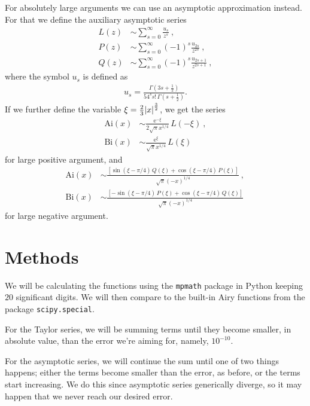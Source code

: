 \documentclass[10pt,a4paper,twocolumn]{article}
\newcommand{\Ai}{\mathrm{Ai}}
\newcommand{\Bi}{\mathrm{Bi}}
\begin{document}
For absolutely large arguments we can use an asymptotic approximation \cite{formulas} instead. For that we define the auxiliary asymptotic series
%
\begin{align}
  L(z) &\sim \sum_{s=0}^\infty \frac{u_s}{z^s}\>, \\
  P(z) &\sim \sum_{s=0}^\infty (-1)^s \frac{u_{2s}}{z^{2 s}}\>, \\
  Q(z) &\sim \sum_{s=0}^\infty (-1)^s \frac{u_{2s+1}}{z^{2 s+1}}\>,
\end{align}
%
where the symbol $u_s$ is defined as
%
\begin{align}
u_s = \frac{ \Gamma(3s + \frac{1}{2})}
        {54^s s!\, \Gamma(s + \frac{1}{2}) }.
\end{align}
%
If we further define the variable $\xi = \frac{2}{3} \abs{x}^{\frac{3}{2}}$, we get the series
%
\begin{align}
\Ai(x) &\sim  \frac{\mathrm{e}^{-\xi}}{2\sqrt{\pi} x^{1/4}} \, L(-\xi) \>, \\
\Bi(x) &\sim  \frac{\mathrm{e}^{\xi}} { \sqrt{\pi} x^{1/4}} \, L(\xi)\>
\end{align}
%
for large positive argument, and
%
\begin{align}
    \Ai(x) &\sim  \frac{\left[\sin(\xi-\pi/4) \, Q(\xi)
                    + \cos(\xi-\pi/4) \, P(\xi)\right]}{\sqrt{\pi} (-x)^{1/4}}
     \>, \\
    \Bi(x) &\sim  \frac{\left[- \sin(\xi-\pi/4) \, P(\xi)
      + \cos(\xi-\pi/4) \, Q(\xi)\right]}{\sqrt{\pi} (-x)^{1/4}}
    \>
\end{align}
%
for large negative argument.

\section{Methods}

We will be calculating the functions using the \texttt{mpmath} package \cite{docs} in Python keeping $20$ significant digits. We will then compare to the built-in Airy functions from the package \texttt{scipy.special}.

For the Taylor series, we will be summing terms until they become smaller, in absolute value, than the error we're aiming for, namely, $10^{-10}$.

For the asymptotic series, we will continue the sum until one of two things happens; either the terms become smaller than the error, as before,  or the terms start increasing. We do this since asymptotic series generically diverge, so it may happen that we never reach our desired error.
\end{document}
